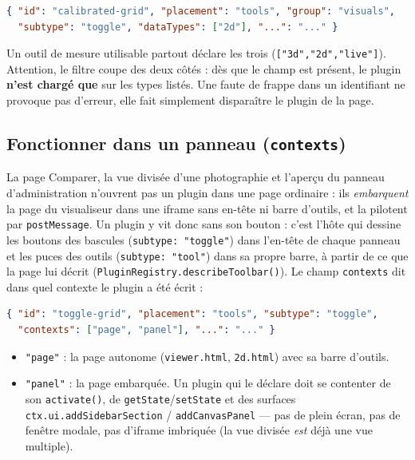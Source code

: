 \documentclass[11pt,a4paper]{article}
\newcommand{\code}[1]{\texttt{#1}}
\newcommand{\filepath}[1]{\texttt{\small #1}}
\begin{document}
\begin{lstlisting}[language=json]
{ "id": "calibrated-grid", "placement": "tools", "group": "visuals",
  "subtype": "toggle", "dataTypes": ["2d"], "...": "..." }
\end{lstlisting}

Un outil de mesure utilisable partout déclare les trois
(\code{["3d","2d","live"]}). Attention, le filtre coupe des deux
côtés : dès que le champ est présent, le plugin \textbf{n'est chargé que} sur les
types listés. Une faute de frappe dans un identifiant ne provoque pas d'erreur,
elle fait simplement disparaître le plugin de la page.

\subsection{Fonctionner dans un panneau (\code{contexts})}
\label{sec:contexts}

La page Comparer, la vue divisée d'une photographie et l'aperçu du panneau
d'administration n'ouvrent pas un plugin dans une page ordinaire : ils
\emph{embarquent} la page du visualiseur dans une iframe sans en-tête ni barre
d'outils, et la pilotent par \code{postMessage}. Un plugin y vit donc sans son
bouton : c'est l'hôte qui dessine les boutons des bascules (\code{subtype:
"toggle"}) dans l'en-tête de chaque panneau et les puces des outils
(\code{subtype: "tool"}) dans sa propre barre, à partir de ce que la page lui
décrit (\code{PluginRegistry.describeToolbar()}). Le champ \code{contexts} dit
dans quel contexte le plugin a été écrit :

\begin{lstlisting}[language=json]
{ "id": "toggle-grid", "placement": "tools", "subtype": "toggle",
  "contexts": ["page", "panel"], "...": "..." }
\end{lstlisting}

\begin{itemize}
  \item \code{"page"} : la page autonome (\filepath{viewer.html},
        \filepath{2d.html}) avec sa barre d'outils.
  \item \code{"panel"} : la page embarquée. Un plugin qui le déclare doit se
        contenter de son \code{activate()}, de \code{getState}/\code{setState}
        et des surfaces \code{ctx.ui.addSidebarSection} / \code{addCanvasPanel}
        --- pas de plein écran, pas de fenêtre modale, pas d'iframe imbriquée
        (la vue divisée \emph{est} déjà une vue multiple).
\end{itemize}
\end{document}
